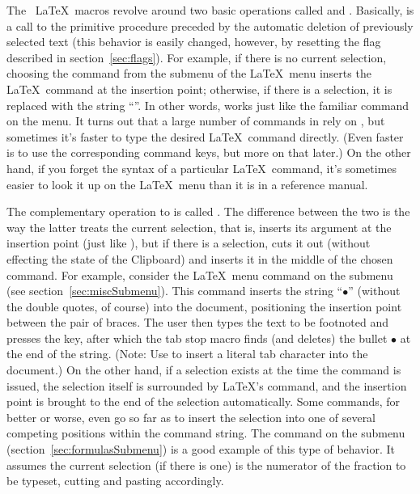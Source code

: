 \documentclass{report}
\begin{document}
The \Alpha\ \LaTeX\ macros revolve around two basic operations called 
 and .  Basically, 
 is a call to the primitive procedure 
 preceded by the automatic deletion of previously 
selected text (this behavior is easily changed, however, by resetting 
the flag  described in 
section~\ref{sec:flags}).  For example, if there is no current 
selection, choosing the command  from the  
submenu of the \LaTeX\ menu inserts the \LaTeX\ command  at 
the insertion point; otherwise, if there is a selection, it is 
replaced with the string ``''.  In other words, 
 works just like the familiar  command 
on the  menu.  It turns out that a large number of 
commands in  rely on , but 
sometimes it's faster to type the desired \LaTeX\ command directly.  
(Even faster is to use the corresponding command keys, but more on 
that later.)  On the other hand, if you forget the syntax of a 
particular \LaTeX\ command, it's sometimes easier to look it up on the 
\LaTeX\ menu than it is in a reference manual.

The complementary operation to  is called 
.  The difference between the two is the way the 
latter treats the current selection, that is,  
inserts its argument at the insertion point (just like 
), but if there is a selection,  
cuts it out (without effecting the state of the Clipboard) and inserts 
it in the middle of the chosen command.  For example, consider the 
\LaTeX\ menu command  on the  
submenu (see section~\ref{sec:miscSubmenu}).  This command inserts the 
string ``$\bullet$'' (without the double quotes, of 
course) into the document, positioning the insertion point between the 
pair of braces.  The user then types the text to be footnoted and 
presses the  key, after which the tab stop macro finds (and 
deletes) the bullet $\bullet$ at the end of the string.  (Note: Use 
 to insert a literal tab character into the document.)  
On the other hand, if a selection exists at the time the 
 command is issued, the selection itself is surrounded 
by \LaTeX's  command, and the insertion point is brought 
to the end of the selection automatically.  Some commands, for better 
or worse, even go so far as to insert the selection into one of 
several competing positions within the command string.  The 
 command on the  submenu 
(section~\ref{sec:formulasSubmenu}) is a good example of this type of 
behavior.  It assumes the current selection (if there is one) is the 
numerator of the fraction to be typeset, cutting and pasting 
accordingly.
\end{document}
